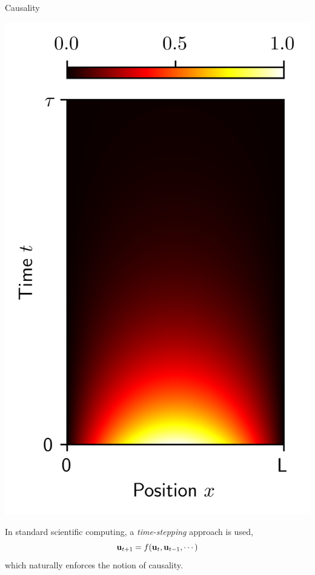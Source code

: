 \documentclass[aspectratio=169,compress,12pt,dvipsnames]{beamer}
\begin{document}
\begin{frame}{Causality}
  \vfill
  \begin{minipage}{.28\textwidth}
    \centering
    \includegraphics[width=\textwidth]{true_solution.png}
  \end{minipage}%
  \hfill
  \begin{minipage}{.68\textwidth}
    In standard scientific computing, a \emph{time-stepping} approach is used, \ie
    \[
      \vb{u}_{t+1} = f(\vb{u}_t, \vb{u}_{t-1}, \cdots)
    \]
    which naturally enforces the notion of causality.
  \end{minipage}
  \vfill
\end{frame}
\end{document}
